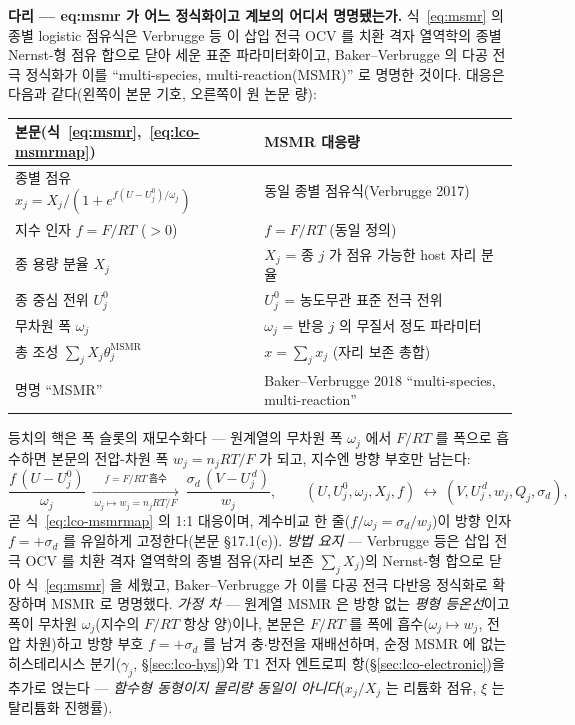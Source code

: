 \begin{srcbox}
\textbf{다리 --- eq:msmr 가 어느 정식화이고 계보의 어디서 명명됐는가.} 식~\eqref{eq:msmr} 의 종별
logistic 점유식은 Verbrugge 등\cite{msmr_origin2017} 이 삽입 전극 OCV 를 치환 격자 열역학의 종별
Nernst-형 점유 합으로 닫아 세운 표준 파라미터화이고, Baker--Verbrugge\cite{bakerverbrugge2018} 의 다공
전극 정식화가 이를 ``multi-species, multi-reaction(MSMR)'' 로 명명한 것이다. 대응은 다음과 같다(왼쪽이
본문 기호, 오른쪽이 원 논문 량):
\begin{center}\footnotesize
\begin{tabular}{@{}ll@{}}
\hline
본문(식~\eqref{eq:msmr},~\eqref{eq:lco-msmrmap}) & MSMR\cite{msmr_origin2017,bakerverbrugge2018} 대응량 \\
\hline
종별 점유 $x_j=X_j/(1+e^{f(U-U_j^0)/\omega_j})$ & 동일 종별 점유식(Verbrugge 2017) \\
지수 인자 $f=F/RT$ ($>0$) & $f=F/RT$ (동일 정의) \\
종 용량 분율 $X_j$ & $X_j$ = 종 $j$ 가 점유 가능한 host 자리 분율 \\
종 중심 전위 $U_j^0$ & $U_j^0$ = 농도무관 표준 전극 전위 \\
무차원 폭 $\omega_j$ & $\omega_j$ = 반응 $j$ 의 무질서 정도 파라미터 \\
총 조성 $\sum_jX_j\theta_j^{\mathrm{MSMR}}$ & $x=\sum_j x_j$ (자리 보존 총합) \\
명명 ``MSMR'' & Baker--Verbrugge 2018 ``multi-species, multi-reaction'' \\
\hline
\end{tabular}
\end{center}
등치의 핵은 폭 슬롯의 재모수화다 --- 원계열의 무차원 폭 $\omega_j$ 에서 $F/RT$ 를 폭으로 흡수하면
본문의 전압-차원 폭 $w_j=n_jRT/F$ 가 되고, 지수엔 방향 부호만 남는다:
\begin{equation}
\frac{f\,(U-U_j^0)}{\omega_j}\ \xrightarrow[\ \omega_j\mapsto w_j=n_jRT/F\ ]{\ f=F/RT\ \text{흡수}\ }\
\frac{\sigma_d\,(V-U_j^{\,d})}{w_j},
\qquad (U,U_j^0,\omega_j,X_j,f)\ \leftrightarrow\ (V,U_j^{\,d},w_j,Q_j,\sigma_d),
\label{eq:br-msmr-1}
\end{equation}
곧 식~\eqref{eq:lco-msmrmap} 의 1:1 대응이며, 계수비교 한 줄($f/\omega_j=\sigma_d/w_j$)이 방향 인자
$f=+\sigma_d$ 를 유일하게 고정한다(본문 §17.1(c)). \emph{방법 요지} --- Verbrugge 등은 삽입 전극 OCV 를
치환 격자 열역학의 종별 점유(자리 보존 $\sum_jX_j$)의 Nernst-형 합으로 닫아 식~\eqref{eq:msmr} 을
세웠고, Baker--Verbrugge 가 이를 다공 전극 다반응 정식화로 확장하며 MSMR 로 명명했다. \emph{가정 차}
--- 원계열 MSMR 은 방향 없는 \emph{평형 등온선}이고 폭이 무차원 $\omega_j$(지수의 $F/RT$ 항상 양)이나,
본문은 $F/RT$ 를 폭에 흡수($\omega_j\!\mapsto\!w_j$, 전압 차원)하고 방향 부호 $f=+\sigma_d$ 를 남겨
충$\cdot$방전을 재배선하며, 순정 MSMR 에 없는 히스테리시스 분기($\gamma_j$, \S\ref{sec:lco-hys})와 T1
전자 엔트로피 항(\S\ref{sec:lco-electronic})을 추가로 얹는다 --- \emph{함수형 동형이지 물리량 동일이
아니다}($x_j/X_j$ 는 리튬화 점유, $\xi$ 는 탈리튬화 진행률).
\end{srcbox}

